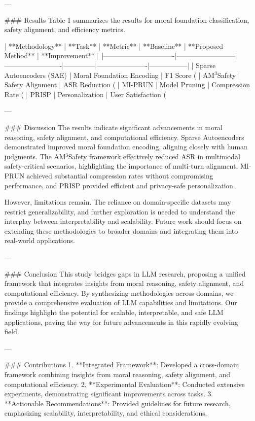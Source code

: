 ---

### Results
Table 1 summarizes the results for moral foundation classification, safety alignment, and efficiency metrics.

| **Methodology**               | **Task**                 | **Metric**              | **Baseline** | **Proposed Method** | **Improvement** |
|-------------------------------|--------------------------|-------------------------|--------------|----------------------|-----------------|
| Sparse Autoencoders (SAE)     | Moral Foundation Encoding | F1 Score (%
| AM$^3$Safety                  | Safety Alignment         | ASR Reduction (%
| MI-PRUN                       | Model Pruning            | Compression Rate (%
| PRISP                         | Personalization          | User Satisfaction (%

---

### Discussion
The results indicate significant advancements in moral reasoning, safety alignment, and computational efficiency. Sparse Autoencoders demonstrated improved moral foundation encoding, aligning closely with human judgments. The AM$^3$Safety framework effectively reduced ASR in multimodal safety-critical scenarios, highlighting the importance of multi-turn alignment. MI-PRUN achieved substantial compression rates without compromising performance, and PRISP provided efficient and privacy-safe personalization.

However, limitations remain. The reliance on domain-specific datasets may restrict generalizability, and further exploration is needed to understand the interplay between interpretability and scalability. Future work should focus on extending these methodologies to broader domains and integrating them into real-world applications.

---

### Conclusion
This study bridges gaps in LLM research, proposing a unified framework that integrates insights from moral reasoning, safety alignment, and computational efficiency. By synthesizing methodologies across domains, we provide a comprehensive evaluation of LLM capabilities and limitations. Our findings highlight the potential for scalable, interpretable, and safe LLM applications, paving the way for future advancements in this rapidly evolving field.

---

### Contributions
1. **Integrated Framework**: Developed a cross-domain framework combining insights from moral reasoning, safety alignment, and computational efficiency.
2. **Experimental Evaluation**: Conducted extensive experiments, demonstrating significant improvements across tasks.
3. **Actionable Recommendations**: Provided guidelines for future research, emphasizing scalability, interpretability, and ethical considerations.

